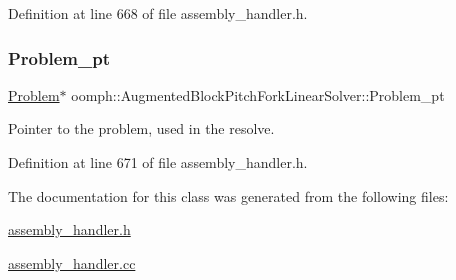 Definition at line 668 of file assembly\+\_\+handler.\+h.

\mbox{\label{classoomph_1_1AugmentedBlockPitchForkLinearSolver_ad9e72a0a848aebe2b107a56b45aa4552}} 
\subsubsection{\texorpdfstring{Problem\+\_\+pt}{Problem\_pt}}
{\footnotesize\ttfamily \hyperlink{classoomph_1_1Problem}{Problem}$\ast$ oomph\+::\+Augmented\+Block\+Pitch\+Fork\+Linear\+Solver\+::\+Problem\+\_\+pt\hspace{0.3cm}{\ttfamily [private]}}



Pointer to the problem, used in the resolve. 



Definition at line 671 of file assembly\+\_\+handler.\+h.



The documentation for this class was generated from the following files\+:\begin{DoxyCompactItemize}
\item 
\hyperlink{assembly__handler_8h}{assembly\+\_\+handler.\+h}\item 
\hyperlink{assembly__handler_8cc}{assembly\+\_\+handler.\+cc}\end{DoxyCompactItemize}

